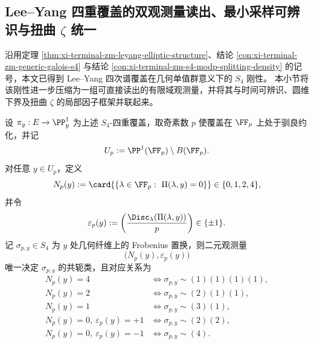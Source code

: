 \subsection{Lee--Yang 四重覆盖的双观测量读出、最小采样可辨识与扭曲 \texorpdfstring{$\zeta$}{zeta} 统一}\label{subsec:conclusion-leyang-s4-double-observable-chebotarev-sampling-zeta}
沿用定理 \ref{thm:xi-terminal-zm-leyang-elliptic-structure}、结论 \ref{con:xi-terminal-zm-generic-galois-s4} 与结论 \ref{con:xi-terminal-zm-s4-modp-splitting-density} 的记号，本文已得到 Lee--Yang 四次谱覆盖在几何单值群意义下的 \(S_4\) 刚性。
本小节将该刚性进一步压缩为一组可直接读出的有限域观测量，并将其与时间可辨识、圆维下界及扭曲 \(\zeta\) 的局部因子框架并联起来。

\begin{theorem}\label{thm:conclusion-leyang-s4-double-observable-classification}
设 \(\pi_y:E\to\PP^1_y\) 为上述 \(S_4\)-四重覆盖，取奇素数 \(p\) 使覆盖在 \(\FF_p\) 上处于驯良约化，并记
\[
U_p:=\PP^1(\FF_p)\setminus B(\FF_p).
\]
对任意 \(y\in U_p\)，定义
\[
N_p(y):=\card{\{\lambda\in\FF_p:\ \Pi(\lambda,y)=0\}}\in\{0,1,2,4\},
\]
并令
\[
\varepsilon_p(y):=
\left(\frac{\Disc_\lambda(\Pi(\lambda,y))}{p}\right)\in\{\pm1\}.
\]
记 \(\sigma_{p,y}\in S_4\) 为 \(y\) 处几何纤维上的 Frobenius 置换，则二元观测量
\[
\bigl(N_p(y),\varepsilon_p(y)\bigr)
\]
唯一决定 \(\sigma_{p,y}\) 的共轭类，且对应关系为
\begin{equation}\label{eq:conclusion-leyang-s4-double-observable-class-map}
\begin{aligned}
N_p(y)=4
&\Longleftrightarrow
\sigma_{p,y}\sim (1)(1)(1)(1),\\
N_p(y)=2
&\Longleftrightarrow
\sigma_{p,y}\sim (2)(1)(1),\\
N_p(y)=1
&\Longleftrightarrow
\sigma_{p,y}\sim (3)(1),\\
N_p(y)=0,\ \varepsilon_p(y)=+1
&\Longleftrightarrow
\sigma_{p,y}\sim (2)(2),\\
N_p(y)=0,\ \varepsilon_p(y)=-1
&\Longleftrightarrow
\sigma_{p,y}\sim (4).
\end{aligned}
\end{equation}
\end{theorem}
